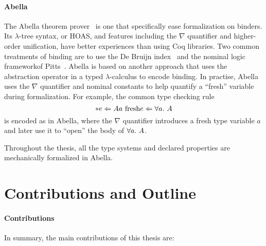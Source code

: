 \paragraph{Abella}
The Abella theorem prover~\cite{AbellaDesc} is one that specifically ease
formalization on binders.
Its $\lambda$-tree syntax, or HOAS, and features including the $\nabla$ quantifier
and higher-order unification, have better experiences than using Coq libraries.
Two common treatments of binding are to use the De Bruijn index~\citep{DEBRUIJN1972381}
and the nominal logic frameworkof Pitts~\citep{PITTS2003165}.
Abella is based on another approach that uses the abstraction operator in a typed
$\lambda$-calculus to encode binding.
In practise, Abella uses the $\nabla$ quantifier and nominal constants to help
quantify a ``fresh'' variable during formalization.
For example, the common type checking rule
$$\inferrule*{e \Lto A \\ a \text{ fresh}}{e \Lto \all A}$$
is encoded as
in Abella, where the $\nabla$ quantifier introduces a fresh type variable $a$
and later use it to ``open'' the body of $\all A$.

Throughout the thesis, all the type systems and declared properties are
mechanically formalized in Abella.



\section{Contributions and Outline}

\paragraph{Contributions}
In summary, the main contributions of this thesis are:


